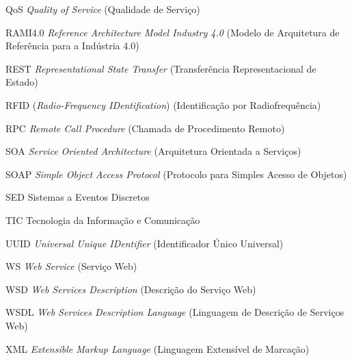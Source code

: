 \begin{siglas}
	\item[QoS] \textit{Quality of Service} (Qualidade de Serviço)
	\item[RAMI4.0] \textit{Reference Architecture Model Industry 4.0} (Modelo de Arquitetura de Referência para a Indústria 4.0)
	\item[REST] \textit{Representational State Transfer} (Transferência Representacional de Estado)
	\item[RFID] (\textit{Radio-Frequency IDentification}) (Identificação por Radiofrequência)
	\item[RPC] \textit{Remote Call Procedure} (Chamada de Procedimento Remoto)
	\item[SOA] \textit{Service Oriented Architecture} (Arquitetura Orientada a Serviços)
	\item[SOAP] \textit{Simple Object Access Protocol} (Protocolo para Simples Acesso de Objetos)
	\item[SED] Sistemas a Eventos Discretos
	\item[TIC] Tecnologia da Informação e Comunicação
	\item[UUID] \textit{Universal Unique IDentifier} (Identificador Único Universal)
	\item[WS] \textit{Web Service} (Serviço Web)
	\item[WSD] \textit{Web Services Description} (Descrição do Serviço Web)
	\item[WSDL] \textit{Web Services Description Language} (Linguagem de Descrição de Serviços Web)
	\item[XML] \textit{Extensible Markup Language} (Linguagem Extensível de Marcação)
\end{siglas}

\tableofcontents*
\cleardoublepage
